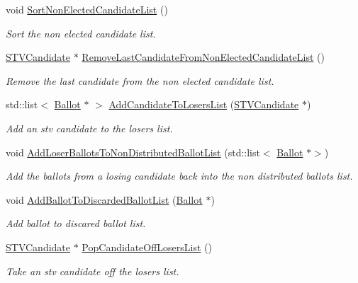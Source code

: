 \begin{DoxyCompactItemize}
\mbox{\label{classSTVElectionRecord_a856aa1d361b69b646072579f098b0b3c}} 
void \hyperlink{classSTVElectionRecord_a856aa1d361b69b646072579f098b0b3c}{Sort\+Non\+Elected\+Candidate\+List} ()
\begin{DoxyCompactList}\small\item\em Sort the non elected candidate list. \end{DoxyCompactList}\item 
\hyperlink{classSTVCandidate}{S\+T\+V\+Candidate} $\ast$ \hyperlink{classSTVElectionRecord_a741e5d955734ed07db8465cbaa3b0091}{Remove\+Last\+Candidate\+From\+Non\+Elected\+Candidate\+List} ()
\begin{DoxyCompactList}\small\item\em Remove the last candidate from the non elected candidate list. \end{DoxyCompactList}\item 
std\+::list$<$ \hyperlink{classBallot}{Ballot} $\ast$ $>$ \hyperlink{classSTVElectionRecord_a5909386b596e6563a2ec332921133ab6}{Add\+Candidate\+To\+Losers\+List} (\hyperlink{classSTVCandidate}{S\+T\+V\+Candidate} $\ast$)
\begin{DoxyCompactList}\small\item\em Add an stv candidate to the losers list. \end{DoxyCompactList}\item 
void \hyperlink{classSTVElectionRecord_a04c1523f0e9f60e87544542fc39c56c4}{Add\+Loser\+Ballots\+To\+Non\+Distributed\+Ballot\+List} (std\+::list$<$ \hyperlink{classBallot}{Ballot} $\ast$$>$)
\begin{DoxyCompactList}\small\item\em Add the ballots from a losing candidate back into the non distributed ballots list. \end{DoxyCompactList}\item 
void \hyperlink{classSTVElectionRecord_a441b1386f1c250a6e2c92763b31bd1a2}{Add\+Ballot\+To\+Discarded\+Ballot\+List} (\hyperlink{classBallot}{Ballot} $\ast$)
\begin{DoxyCompactList}\small\item\em Add ballot to discared ballot list. \end{DoxyCompactList}\item 
\hyperlink{classSTVCandidate}{S\+T\+V\+Candidate} $\ast$ \hyperlink{classSTVElectionRecord_ae7078fcee0d4b897d1536bee9ac342f6}{Pop\+Candidate\+Off\+Losers\+List} ()
\begin{DoxyCompactList}\small\item\em Take an stv candidate off the losers list. \end{DoxyCompactList}\end{DoxyCompactItemize}


